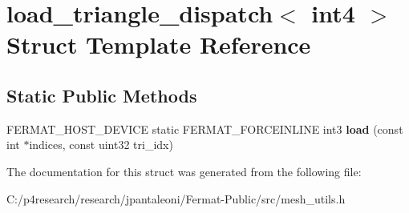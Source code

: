 \hypertarget{structload__triangle__dispatch_3_01int4_01_4}{}\section{load\+\_\+triangle\+\_\+dispatch$<$ int4 $>$ Struct Template Reference}
\label{structload__triangle__dispatch_3_01int4_01_4}
\subsection*{Static Public Methods}
\begin{DoxyCompactItemize}
\item 
\mbox{\label{structload__triangle__dispatch_3_01int4_01_4_a49ac32966e4236e13468a201fee8ab7f}} 
F\+E\+R\+M\+A\+T\+\_\+\+H\+O\+S\+T\+\_\+\+D\+E\+V\+I\+CE static F\+E\+R\+M\+A\+T\+\_\+\+F\+O\+R\+C\+E\+I\+N\+L\+I\+NE int3 {\bfseries load} (const int $\ast$indices, const uint32 tri\+\_\+idx)
\end{DoxyCompactItemize}


The documentation for this struct was generated from the following file\+:\begin{DoxyCompactItemize}
\item 
C\+:/p4research/research/jpantaleoni/\+Fermat-\/\+Public/src/mesh\+\_\+utils.\+h\end{DoxyCompactItemize}
